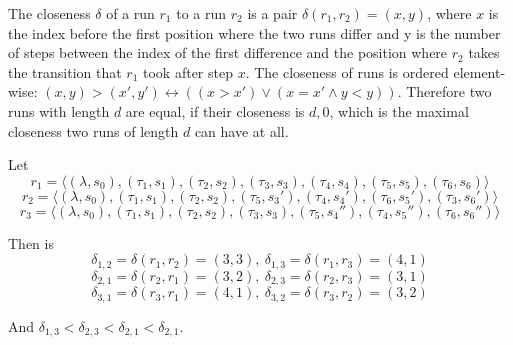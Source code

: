 \begin{definition}[name = Closeness of Runs]\label{def:runs_closeness}
  The closeness \(\delta\) of a run \(r_1\) to a run \(r_2\) is a pair \(\delta(r_1,r_2) = (x,y)\), where \(x\) is the index before the first position where the two runs differ and y is the number of steps between the index of the first difference and the position where \(r_2\) takes the transition that \(r_1\) took after step \(x\).
  The closeness of runs is ordered element-wise: \((x,y) > (x',y') \leftrightarrow ((x > x') \lor (x = x' \land y < y))\).
  Therefore two runs with length \(d\) are equal, if their closeness is \(d,0\), which is the maximal closeness two runs of length \(d\) can have at all.
\end{definition}

\begin{exmp}
  Let
  \[r_1 = \langle (\lambda, s_0), (\tau_1,s_1), (\tau_2,s_2), (\tau_3,s_3), (\tau_4,s_4), (\tau_5,s_5), (\tau_6,s_6) \rangle\]
  \[r_2 = \langle (\lambda, s_0), (\tau_1,s_1), (\tau_2,s_2), (\tau_5,s_3'), (\tau_4,s_4'), (\tau_6,s_5'), (\tau_3,s_6') \rangle\]
  \[r_3 = \langle (\lambda, s_0), (\tau_1,s_1), (\tau_2,s_2), (\tau_3,s_3), (\tau_5,s_4''), (\tau_4,s_5''), (\tau_6,s_6'') \rangle\]

  Then is
  \[\delta_{1,2} = \delta(r_1,r_2) = (3,3),\ \delta_{1,3} = \delta(r_1,r_3) = (4,1)\]
  \[\delta_{2,1} = \delta(r_2,r_1) = (3,2),\ \delta_{2,3} = \delta(r_2,r_3) = (3,1)\]
  \[\delta_{3,1} = \delta(r_3,r_1) = (4,1),\ \delta_{3,2} = \delta(r_3,r_2) = (3,2)\]

  And \(\delta_{1,3} < \delta_{2,3} < \delta_{2,1} < \delta_{2,1}\).


\end{exmp}

